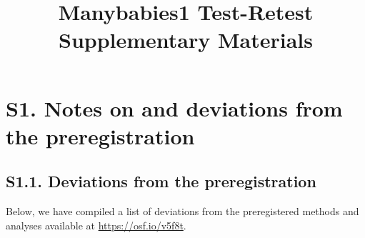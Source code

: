 \documentclass[
  man, donotrepeattitle,floatsintext]{apa6}
\title{Manybabies1 Test-Retest Supplementary Materials}
\author{\phantom{0}}
\date{}
\affiliation{\phantom{0}}
\begin{document}
\maketitle

{
\setcounter{tocdepth}{3}
\tableofcontents
}
\newpage

\hypertarget{s1.-notes-on-and-deviations-from-the-preregistration}{%
\section{S1. Notes on and deviations from the preregistration}\label{s1.-notes-on-and-deviations-from-the-preregistration}}

\hypertarget{s1.1.-deviations-from-the-preregistration}{%
\subsection{S1.1. Deviations from the preregistration}\label{s1.1.-deviations-from-the-preregistration}}

Below, we have compiled a list of deviations from the preregistered methods and analyses available at \url{https://osf.io/v5f8t}.
\end{document}

